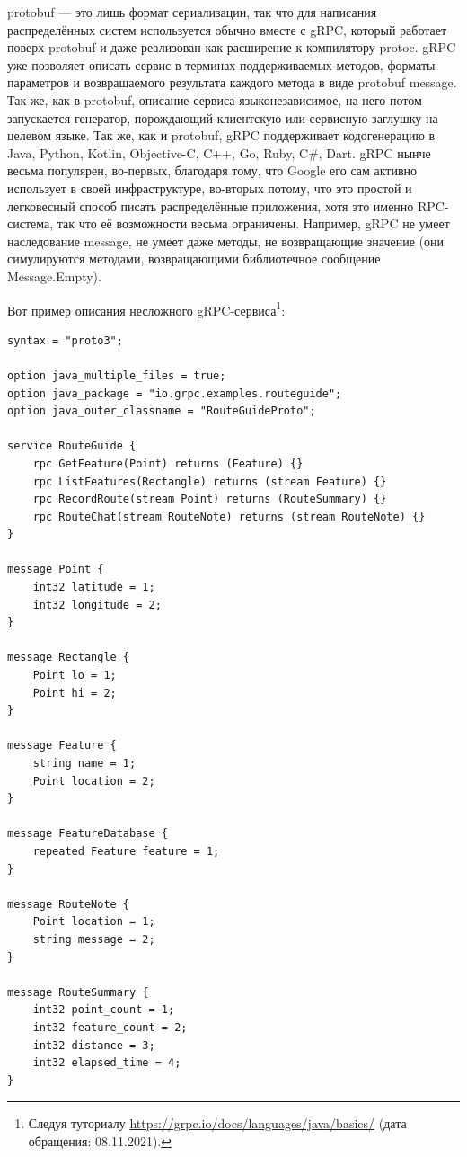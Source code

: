 \documentclass{../../text-style}
\begin{document}
protobuf --- это лишь формат сериализации, так что для написания распределённых систем используется обычно вместе с gRPC, который работает поверх protobuf и даже реализован как расширение к компилятору protoc. gRPC уже позволяет описать сервис в терминах поддерживаемых методов, форматы параметров и возвращаемого результата каждого метода в виде protobuf message. Так же, как в protobuf, описание сервиса языконезависимое, на него потом запускается генератор, порождающий клиентскую или сервисную заглушку на целевом языке. Так же, как и protobuf, gRPC поддерживает кодогенерацию в Java, Python, Kotlin, Objective-C, C++, Go, Ruby, C\#, Dart. gRPC нынче весьма популярен, во-первых, благодаря тому, что Google его сам активно использует в своей инфраструктуре, во-вторых потому, что это простой и легковесный способ писать распределённые приложения, хотя это именно RPC-система, так что её возможности весьма ограничены. Например, gRPC не умеет наследование message, не умеет даже методы, не возвращающие значение (они симулируются методами, возвращающими библиотечное сообщение Message.Empty).

Вот пример описания несложного gRPC-сервиса\footnote{Следуя туториалу \url{https://grpc.io/docs/languages/java/basics/} (дата обращения: 08.11.2021).}:

\begin{verbatim}
syntax = "proto3";

option java_multiple_files = true;
option java_package = "io.grpc.examples.routeguide";
option java_outer_classname = "RouteGuideProto";

service RouteGuide {
    rpc GetFeature(Point) returns (Feature) {}
    rpc ListFeatures(Rectangle) returns (stream Feature) {}
    rpc RecordRoute(stream Point) returns (RouteSummary) {}
    rpc RouteChat(stream RouteNote) returns (stream RouteNote) {}
}

message Point {
    int32 latitude = 1;
    int32 longitude = 2;
}

message Rectangle {
    Point lo = 1;
    Point hi = 2;
}

message Feature {
    string name = 1;
    Point location = 2;
}

message FeatureDatabase {
    repeated Feature feature = 1;
}

message RouteNote {
    Point location = 1;
    string message = 2;
}

message RouteSummary {
    int32 point_count = 1;
    int32 feature_count = 2;
    int32 distance = 3;
    int32 elapsed_time = 4;
}
\end{verbatim}
\end{document}
